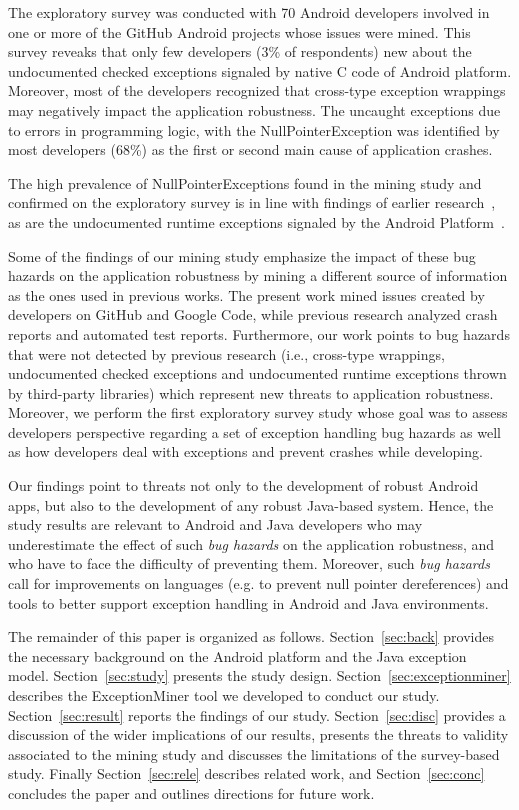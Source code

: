 The exploratory survey was conducted with 70 Android developers involved in one or more of the 
GitHub Android projects whose issues were mined. This survey reveaks that only few developers (3\% of respondents)
 new about the undocumented checked exceptions signaled by native C code of Android platform. 
Moreover, most of the developers recognized that cross-type exception wrappings may
negatively impact the application robustness. The uncaught exceptions due to errors in programming 
logic, with the NullPointerException was identified by most developers (68\%) as the first or second main cause 
of application crashes.

 The high prevalence of NullPointerExceptions found in the mining study and confirmed on the exploratory survey
 is in line with findings of earlier research~\cite{kim2013predicting,fraser20131600,csallner2004jcrasher}, 
as are the undocumented runtime exceptions signaled by the Android Platform~\cite{kechagia2014}. 

Some of the findings of our mining study emphasize the impact of these bug hazards on the application robustness 
by mining a different source of information as the ones used in previous works. The present work 
mined issues created by developers on GitHub and Google Code, while  previous research analyzed crash reports and automated test reports.
 Furthermore, our work points to bug hazards that were not detected by previous research (i.e., cross-type wrappings, undocumented checked exceptions and undocumented runtime exceptions thrown by third-party libraries) which represent new threats to application robustness.
Moreover, we perform  the first exploratory survey study whose
goal was to assess developers perspective regarding a set of exception handling bug hazards
as well as how developers deal with exceptions and prevent crashes while developing.

Our findings point to threats not only to the development of robust Android apps, 
but also to the development of any robust Java-based system. 
Hence, the study results are relevant to Android and Java developers who may underestimate the effect of such
 \emph{bug hazards} on the application robustness,
and who have to face the difficulty of preventing them.
Moreover, such \emph{bug hazards} 
call for improvements on languages (e.g. to prevent null pointer dereferences) and tools to better support exception handling in Android and Java environments.

The remainder of this paper is organized as follows. 
Section~\ref{sec:back} provides the necessary
background on the Android platform and the Java exception model. 
Section~\ref{sec:study} presents the study design. 
Section~\ref{sec:exceptionminer} describes the ExceptionMiner tool we developed to conduct our study.
Section~\ref{sec:result} reports the findings of our study.
Section~\ref{sec:disc} provides a discussion of the wider implications of our results,
 presents the threats to validity associated to the mining study and discusses the limitations
of the survey-based study. 
Finally Section~\ref{sec:rele} describes related work, 
and Section~\ref{sec:conc} concludes the paper and outlines
directions for future work.
